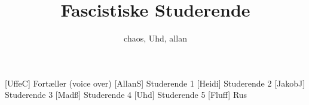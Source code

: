 \documentclass[a4paper,11pt]{article}
\title{Fascistiske Studerende}
\author{chaos, Uhd, allan}
\begin{document}
\maketitle

\begin{roles}
[UffeC] Fortæller (voice over)
[AllanS] Studerende 1
[Heidi] Studerende 2
[JakobJ] Studerende 3
[Madß] Studerende 4
[Uhd] Studerende 5
[Fluff] Rus 
\end{roles}

\begin{props}
\end{props}

  
\end{document}
